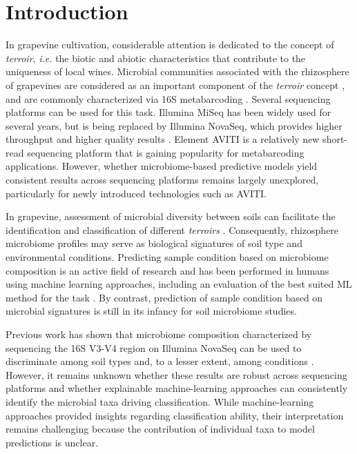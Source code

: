 \documentclass[12pt]{article}
\theoremstyle{thmstyleone}%
\theoremstyle{thmstyletwo}%
\theoremstyle{thmstylethree}%
\begin{document}
\section{Introduction}
In grapevine cultivation, considerable attention is dedicated to the concept of \textit{terroir}, \textit{i.e.} the biotic and abiotic characteristics that contribute to the uniqueness of local wines. Microbial communities associated with the rhizosphere of grapevines are considered as an important component of the \textit{terroir} concept \citep{white2020}, and are commonly characterized via 16S metabarcoding \citep{Zarraonaindia_2015,guazzini_variations_2026}. Several sequencing platforms can be used for this task. Illumina MiSeq has been widely used for several years, but is being replaced by Illumina NovaSeq, which provides higher throughput \citep{Han2024} and higher quality results \citep{singer_comprehensive_2019}. Element AVITI is a relatively new short-read sequencing platform \citep{arslan_aviti_sequencing_2024} that is  gaining popularity for metabarcoding applications. However, whether microbiome-based predictive models yield consistent results across sequencing platforms remains largely unexplored, particularly for newly introduced technologies such as AVITI.

In grapevine, assessment of microbial diversity between soils can facilitate the identification and classification of different \textit{terroirs} \citep{gobbi_global_2022}. Consequently, rhizosphere microbiome profiles may serve as biological signatures of soil type and environmental conditions. Predicting sample condition based on microbiome composition is an active field of research and has been performed in humans using machine learning approaches, including an evaluation of the best suited ML method for the task \citep{Li31122025}. By contrast, prediction of sample condition based on microbial signatures is still in its infancy for soil microbiome studies. 

Previous work has shown that microbiome composition characterized by sequencing the 16S V3-V4 region on Illumina NovaSeq can be used to discriminate among soil types and, to a lesser extent, among conditions \citep{guazzini_variations_2026}. However, it remains unknown whether these results are robust across sequencing platforms and whether explainable machine-learning approaches can consistently identify the microbial taxa driving classification. 
While machine-learning approaches provided insights regarding classification ability, their interpretation remains challenging because the contribution of individual taxa to model predictions is unclear. 
\end{document}
